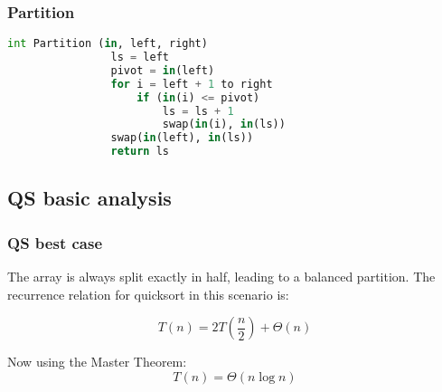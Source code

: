     \subsubsection{Partition}
    \begin{definition}
        \begin{lstlisting}[language=Python, caption={Partition Function Pseudocode}]
            int Partition (in, left, right)
                ls = left
                pivot = in(left)
                for i = left + 1 to right
                    if (in(i) <= pivot)
                        ls = ls + 1
                        swap(in(i), in(ls))
                swap(in(left), in(ls))
                return ls
        \end{lstlisting}

    \end{definition}

    \begin{intuition}
    \end{intuition}

\subsection{QS basic analysis}
    \subsubsection{QS best case}
    \begin{derivation}
        The array is always split exactly in half, leading to a balanced partition. The recurrence relation for quicksort in this scenario is:

        \begin{equation*}
            T(n) = 2T\left(\frac{n}{2}\right) + \Theta(n)
        \end{equation*}

        \begin{center}
        \end{center}

        \noindent Now using the Master Theorem:
        \begin{equation*}
        T(n) = \Theta(n \log n)
        \end{equation*}
    \end{derivation}

